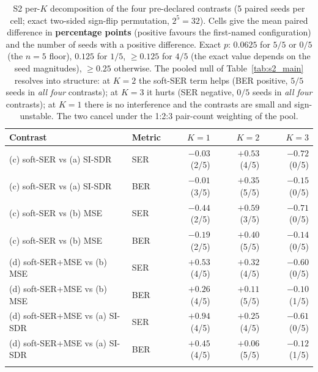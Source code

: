 \documentclass[review,12pt]{elsarticle}
\begin{document}
\begin{table}[H]
\centering
\caption{S2 per-$K$ decomposition of the four pre-declared contrasts (5 paired seeds per cell; exact two-sided sign-flip permutation, $2^5{=}32$). Cells give the mean paired difference in \textbf{percentage points} (positive favours the first-named configuration) and the number of seeds with a positive difference. Exact $p$: $0.0625$ for $5/5$ or $0/5$ (the $n{=}5$ floor), $0.125$ for $1/5$, $\geq 0.125$ for $4/5$ (the exact value depends on the seed magnitudes), $\geq 0.25$ otherwise. The pooled null of Table~\ref{tab:s2_main} resolves into structure: at $K{=}2$ the soft-SER term helps (BER positive, $5/5$ seeds in \emph{all four} contrasts); at $K{=}3$ it hurts (SER negative, $0/5$ seeds in \emph{all four} contrasts); at $K{=}1$ there is no interference and the contrasts are small and sign-unstable. The two cancel under the 1:2:3 pair-count weighting of the pool.}
\label{tab:s2_perk}
\setlength{\tabcolsep}{4pt}
\footnotesize
\begin{tabular}{ll r r r}
\toprule
Contrast & Metric & $K{=}1$ & $K{=}2$ & $K{=}3$ \\
\midrule
(c) soft-SER vs (a) SI-SDR & SER & $-0.03$ (2/5) & $+0.53$ (4/5) & $-0.72$ (0/5) \\
(c) soft-SER vs (a) SI-SDR & BER & $-0.01$ (3/5) & $+0.35$ (5/5) & $-0.15$ (0/5) \\
\addlinespace[2pt]
(c) soft-SER vs (b) MSE & SER & $-0.44$ (2/5) & $+0.59$ (3/5) & $-0.71$ (0/5) \\
(c) soft-SER vs (b) MSE & BER & $-0.19$ (2/5) & $+0.40$ (5/5) & $-0.14$ (0/5) \\
\addlinespace[2pt]
(d) soft-SER+MSE vs (b) MSE & SER & $+0.53$ (4/5) & $+0.32$ (4/5) & $-0.60$ (0/5) \\
(d) soft-SER+MSE vs (b) MSE & BER & $+0.26$ (4/5) & $+0.11$ (5/5) & $-0.10$ (1/5) \\
\addlinespace[2pt]
(d) soft-SER+MSE vs (a) SI-SDR & SER & $+0.94$ (4/5) & $+0.25$ (4/5) & $-0.61$ (0/5) \\
(d) soft-SER+MSE vs (a) SI-SDR & BER & $+0.45$ (4/5) & $+0.06$ (5/5) & $-0.12$ (1/5) \\
\addlinespace[2pt]
\bottomrule
\end{tabular}
\end{table}
\end{document}
